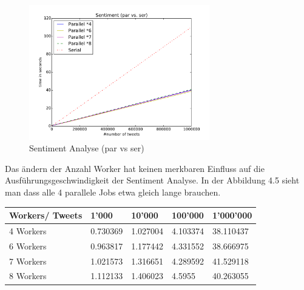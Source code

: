 \documentclass[12pt, oneside]{report}   	%
\begin{document}
\begin{figure}[h]
\begin{center}
\includegraphics[width=0.7\textwidth]{bilder/time_senitment_par-ser.pdf}
\caption{Sentiment Analyse (par vs ser)}
\label{img:performancesentiment}
\end{center}
\end{figure}

Das ändern der Anzahl Worker hat keinen merkbaren Einfluss auf die Ausführungsgeschwindigkeit der Sentiment Analyse. In der Abbildung 4.5 sieht man dass alle 4 parallele Jobs etwa gleich lange brauchen.

\begin{table}[h]
    \begin{tabular}{|l|l|l|l|l|}
    \hline
    Workers/ Tweets         & 1'000    & 10'000   & 100'000  & 1'000'000 \\ \hline
    4 Workers & 0.730369 & 1.027004 & 4.103374 & 38.110437 \\ \hline
    6 Workers & 0.963817 & 1.177442 & 4.331552 & 38.666975 \\ \hline
    7 Workers & 1.021573 & 1.316651 & 4.289592 & 41.529118 \\ \hline
    8 Workers & 1.112133 & 1.406023 & 4.5955   & 40.263055 \\ \hline
    \end{tabular}
\end{table}
\end{document}
